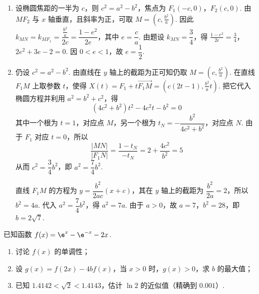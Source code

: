 \begin{solution}
\begin{enumerate}
\item 设椭圆焦距的一半为 \(c\)，则 \(c^2=a^2-b^2\)，焦点为 \(F_1(-c,0)\)，\(F_2(c,0)\). 由 \(MF_2\) 与 \(x\) 轴垂直，且斜率为正，可取 \(M=(c,\frac{b^2}{a})\). 因此
\(k_{MN}=k_{MF_1}=\dfrac{\frac{b^2}{a}}{2c}=\dfrac{1-e^2}{2e}\)，其中 \(e=\dfrac{c}{a}\). 由题设 \(k_{MN}=\dfrac{3}{4}\)，得
\(\frac{1-e^2}{2e}=\frac{3}{4}\)，\(2e^2+3e-2=0\).
因 \(0<e<1\)，故 \(e=\dfrac{1}{2}\).

\item 仍设 \(c^2=a^2-b^2\). 由直线在 \(y\) 轴上的截距为正可知仍取
\(M=\left(c,\frac{b^2}{a}\right)\). 在直线 \(F_1M\) 上取参数 \(t\)，使得
\(X(t)=F_1+t\overrightarrow{F_1M}=(c(2t-1),\frac{b^2}{a}t)\). 把它代入椭圆方程并利用 \(a^2=b^2+c^2\)，得
\[
(4c^2+b^2)t^2-4c^2t-b^2=0
\]
其中一个根为 \(t=1\)，对应点 \(M\)，另一个根为 \(t_N=-\dfrac{b^2}{4c^2+b^2}\)，对应点 \(N\). 由于 \(F_1\) 对应 \(t=0\)，所以
\[
\frac{|MN|}{|F_1N|}=\frac{1-t_N}{-t_N}=2+\frac{4c^2}{b^2}=5
\]
从而 \(c^2=\dfrac{3}{4}b^2\)，即 \(a^2=\dfrac{7}{4}b^2\).

直线 \(F_1M\) 的方程为 \(y=\dfrac{b^2}{2ac}(x+c)\)，其在 \(y\) 轴上的截距为 \(\dfrac{b^2}{2a}=2\)，所以 \(b^2=4a\). 代入 \(a^2=\dfrac{7}{4}b^2\)，得 \(a^2=7a\). 由于 \(a>0\)，故 \(a=7\)，\(b^2=28\)，即 \(b=2\sqrt{7}\).
\end{enumerate}
\end{solution}

\begin{problem}
已知函数 \(f(x)=\e^x-\e^{-x}-2x\).
\begin{enumerate}
\item 讨论 \(f(x)\) 的单调性；
\item 设 \(g(x)=f(2x)-4bf(x)\)，当 \(x>0\) 时，\(g(x)>0\)，求 \(b\) 的最大值；
\item 已知 \(1.4142<\sqrt{2}<1.4143\)，估计 \(\ln 2\) 的近似值（精确到 \(0.001\)）.
\end{enumerate}
\end{problem}

